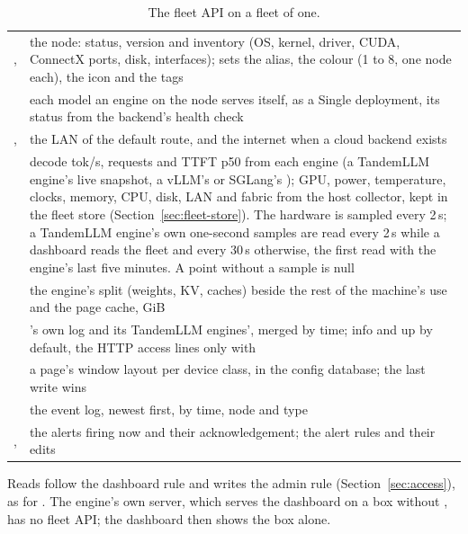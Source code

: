 \begin{table}[htbp]
\centering\small
\caption{The fleet API on a fleet of one.}\label{tab:fleet-one}
\begin{tabularx}{\linewidth}{@{}L{.26\linewidth}Y@{}}
\toprule
{} &  \\
\midrule
{},  & the node: status, version and inventory (OS, kernel, driver, CUDA, ConnectX ports, disk, interfaces);  sets the alias, the colour (1 to 8, one node each), the icon and the tags \\
 & each model an engine on the node serves itself, as a Single deployment, its status from the backend's health check \\
,  & the LAN of the default route, and the internet when a cloud backend exists \\
 & decode tok/s, requests and TTFT p50 from each engine (a TandemLLM engine's live snapshot, a vLLM's or SGLang's ); GPU, power, temperature, clocks, memory, CPU, disk, LAN and fabric from the host collector, kept in the fleet store (Section~\ref{sec:fleet-store}). The hardware is sampled every 2\,s; a TandemLLM engine's own one-second samples are read every 2\,s while a dashboard reads the fleet and every 30\,s otherwise, the first read with the engine's last five minutes. A point without a sample is null \\
 & the engine's split (weights, KV, caches) beside the rest of the machine's use and the page cache, GiB \\
 & 's own log and its TandemLLM engines', merged by time; info and up by default, the HTTP access lines only with  \\
 & a page's window layout per device class, in the config database; the last write wins \\
 & the event log, newest first, by time, node and type \\
,  & the alerts firing now and their acknowledgement; the alert rules and their edits \\
\bottomrule
\end{tabularx}
\end{table}

Reads follow the dashboard rule and writes the admin rule (Section~\ref{sec:access}), as for . The engine's own server, which serves the dashboard on a box without , has no fleet API; the dashboard then shows the box alone.

